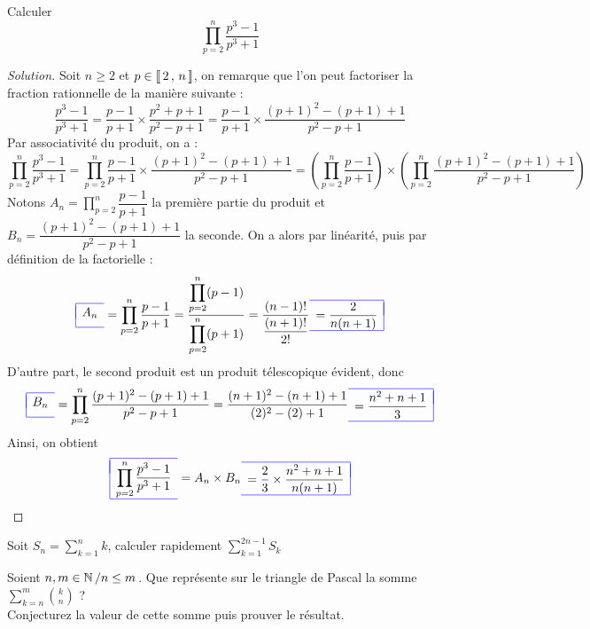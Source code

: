 \documentclass{classe}
\newcommand{\lboxed}[1]{{\color{blue}\begin{array}{|l}\hline\\[-2.4ex]{\color{black}#1}\\[1.2ex]\hline\end{array}}}
\newcommand{\rboxed}[1]{{\color{blue}\begin{array}{r|}\hline\\[-2.4ex]{\color{black}#1}\\[1.2ex]\hline\end{array}}}
\newenvironment{solution}
  {\renewcommand\qedsymbol{$\blacksquare$}\begin{proof}[Solution]}
  {\end{proof}}
\begin{document}
\begin{exercice}
Calculer 
\[
\displaystyle\prod\limits_{p=2}^{n} \dfrac{p^3-1}{p^3+1}
\]
\end{exercice}

\begin{solution}
Soit $n \ge 2$ et $p \in \left\llbracket \, 2 \, , \, n \, \right\rrbracket$, on remarque que l'on peut factoriser la fraction rationnelle de la manière suivante :
\[
\dfrac{p^3-1}{p^3+1} 
= \dfrac{p-1}{p+1} \times \dfrac{p^2 + p + 1}{p^2 - p + 1} 
= \dfrac{p-1}{p+1} \times \dfrac{(p+1)^2 - (p + 1) + 1}{p^2 - p + 1}
\]
Par associativité du produit, on a :
\[
\displaystyle\prod\limits_{p=2}^{n} \dfrac{p^3-1}{p^3+1} 
=
\displaystyle\prod\limits_{p=2}^{n} \dfrac{p-1}{p+1} \times \dfrac{(p+1)^2 - (p + 1) + 1}{p^2 - p + 1}
= \left(\displaystyle\prod\limits_{p=2}^{n} \dfrac{p-1}{p+1}\right) 
\times 
\left(\displaystyle\prod\limits_{p=2}^{n} \dfrac{(p+1)^2 - (p + 1) + 1}{p^2 - p + 1}\right)
\]
Notons $A_n = \displaystyle\prod\limits_{p=2}^{n} \dfrac{p-1}{p+1}$ la première partie du produit et $B_n=\dfrac{(p+1)^2 - (p + 1) + 1}{p^2 - p + 1}$ la seconde.
On a alors par linéarité, puis par définition de la factorielle :
\[
\lboxed{A_n} 
= \displaystyle\prod\limits_{p=2}^{n}\dfrac{p-1}{p+1} 
= \dfrac{\displaystyle\prod\limits_{p=2}^{n}(p-1)}{\displaystyle\prod\limits_{p=2}^{n}(p+1)} 
= \dfrac{(n-1)!}{\dfrac{(n+1)!}{2!}} 
\rboxed{= \dfrac{2}{n(n+1)}}
\]
D'autre part, le second produit est un produit télescopique évident, donc
\[
\lboxed{B_n}
= \displaystyle\prod\limits_{p=2}^{n}\dfrac{(p+1)^2 - (p + 1) + 1}{p^2 - p + 1} 
= \dfrac{(n+1)^2 - (n + 1) + 1}{(2)^2 - (2) + 1} 
\rboxed{= \dfrac{n^2 + n + 1}{3}}
\]
Ainsi, on obtient 
\[
\lboxed{\displaystyle\prod\limits_{p=2}^{n}\dfrac{p^3-1}{p^3+1}} 
= A_n \times B_n 
\rboxed{= \dfrac{2}{3}\times \dfrac{n^2+n+1}{n(n+1)}}
\]
\end{solution}

\begin{exercice}
Soit $S_n=\displaystyle\sum\limits_{k=1}^{n} k$, calculer rapidement $\displaystyle\sum\limits_{k=1}^{2n-1} S_k$
\end{exercice}


\begin{exercice}
Soient $n,m\in\mathbb{N}\left/n \le m\right.$. Que représente sur le triangle de Pascal la somme $\displaystyle\sum\limits_{k=n}^{m} \binom{k}{n}$ ?\\
Conjecturez la valeur de cette somme puis prouver le résultat.
\end{exercice}
\end{document}
